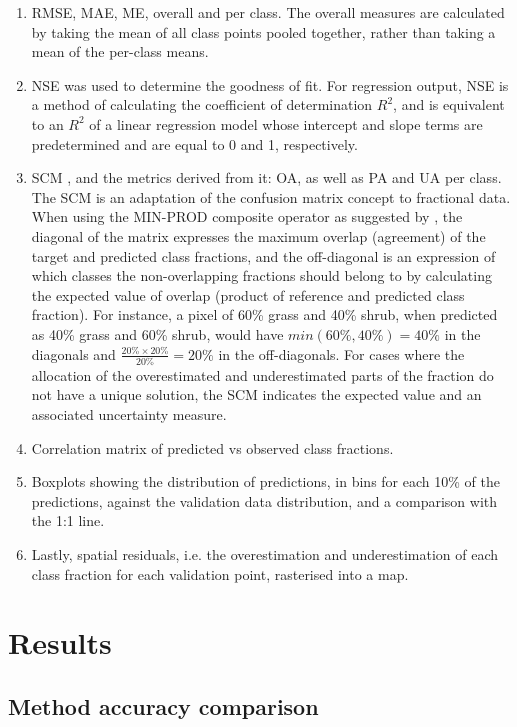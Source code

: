 \documentclass[review,authoryear,3p]{elsarticle}
\begin{document}
\begin{enumerate}
 \item \Gls{RMSE}, \ac{MAE}, \ac{ME}, overall and per class.
The overall measures are calculated by taking the mean of all class points pooled together, rather than taking a mean of the per-class means.
 \item \Gls{NSE} \citep{nash1970river} was used to determine the goodness of fit.
For regression output, \ac{NSE} is a method of calculating the coefficient of determination $R^2$, and is equivalent to an $R^2$ of a linear regression model whose intercept and slope terms are predetermined and are equal to 0 and 1, respectively.
 \item \Gls{SCM} \citep{silvan-cardenas_sub-pixel_2008}, and the metrics derived from it: \ac{OA}, as well as \ac{PA} and \ac{UA} per class.
The \gls{SCM} is an adaptation of the confusion matrix concept to fractional data.
When using the MIN-PROD composite operator as suggested by \citet{silvan-cardenas_sub-pixel_2008}, the diagonal of the matrix expresses the maximum overlap (agreement) of the target and predicted class fractions, and the off-diagonal is an expression of which classes the non-overlapping fractions should belong to by calculating the expected value of overlap (product of reference and predicted class fraction).
For instance, a pixel of 60\% grass and 40\% shrub, when predicted as 40\% grass and 60\% shrub, would have $min(60\%, 40\%)=40\%$ in the diagonals and $\frac{20\%\times20\%}{20\%}=20\%$ in the off-diagonals.
For cases where the allocation of the overestimated and underestimated parts of the fraction do not have a unique solution, the \ac{SCM} indicates the expected value and an associated uncertainty measure.
 \item Correlation matrix of predicted vs observed class fractions.
 \item Boxplots showing the distribution of predictions, in bins for each 10\% of the predictions, against the validation data distribution, and a comparison with the 1:1 line.
\item Lastly, spatial residuals, i.e. the overestimation and underestimation of each class fraction for each validation point, rasterised into a map.
\end{enumerate}

\section{Results}

\subsection{Method accuracy comparison}
\end{document}
